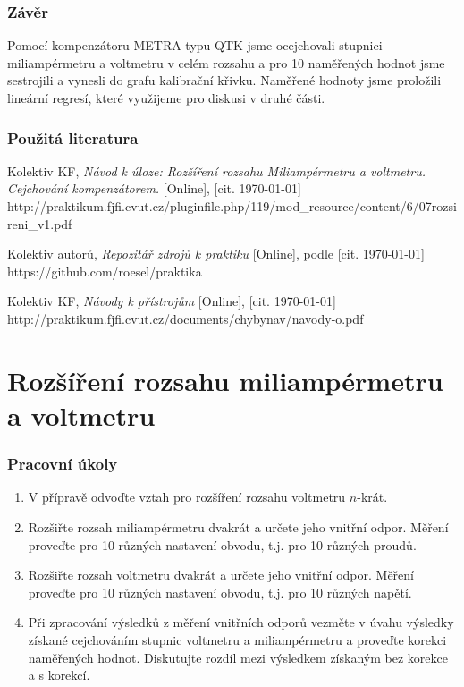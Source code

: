 \documentclass[english]{article}
\begin{document}
\section{Závěr}
Pomocí kompenzátoru METRA typu QTK jsme ocejchovali stupnici miliampérmetru a voltmetru v celém rozsahu a pro 10 naměřených hodnot jsme sestrojili a vynesli do grafu kalibrační křivku. Naměřené hodnoty jsme proložili lineární regresí, které využijeme pro diskusi v druhé části. 


\section {Použitá literatura}

\begin{thebibliography}{9}
 Kolektiv KF, \emph{Návod k úloze: Rozšíření rozsahu Miliampérmetru a voltmetru. Cejchování kompenzátorem.} [Online], [cit. \today] \newline 
http://praktikum.fjfi.cvut.cz/pluginfile.php/119/mod\_resource/content/6/07rozsireni\_v1.pdf

 Kolektiv autorů, \emph{Repozitář zdrojů k praktiku} [Online], podle \cite{bib:pra_navod_uloha} [cit. \today] \newline https://github.com/roesel/praktika

 Kolektiv KF, \emph{Návody k přístrojům} [Online], [cit. \today] \newline http://praktikum.fjfi.cvut.cz/documents/chybynav/navody-o.pdf
\end{thebibliography}



\part{Rozšíření rozsahu miliampérmetru a voltmetru}

\section{Pracovní úkoly}
\begin{enumerate}
  \item V přípravě odvoďte vztah pro rozšíření rozsahu voltmetru $n$-krát.
  \item Rozšiřte rozsah miliampérmetru dvakrát a určete jeho vnitřní odpor. Měření proveďte pro 10 různých nastavení obvodu, t.j. pro 10 různých proudů.
  \item Rozšiřte rozsah voltmetru dvakrát a určete jeho vnitřní odpor. Měření proveďte pro 10 různých nastavení obvodu, t.j. pro 10 různých napětí.
  \item Při zpracování výsledků z měření vnitřních odporů vezměte v úvahu výsledky získané cejchováním stupnic voltmetru a miliampérmetru a proveďte korekci naměřených hodnot. Diskutujte rozdíl mezi výsledkem získaným bez korekce a s korekcí.
\end{enumerate}
\end{document}
